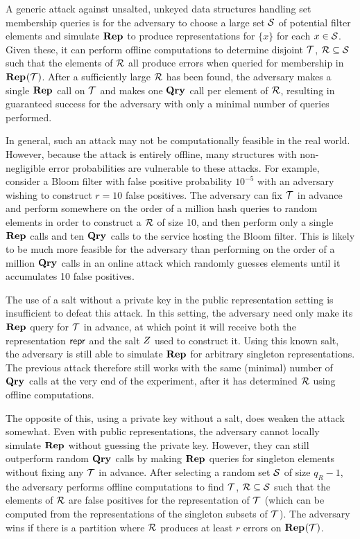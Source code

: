 A generic attack against unsalted, unkeyed data structures handling set membership queries is for the adversary to choose a large set $\mathcal{S}$ of potential filter elements and simulate $\mathbf{Rep}\hspace{0.5pt}$ to produce representations for $\{x\}$ for each $x \in \mathcal{S}$. Given these, it can perform offline computations to determine disjoint $\mathcal{T}$, $\mathcal{R} \subseteq \mathcal{S}$ such that the elements of $\mathcal{R}$ all produce errors when queried for membership in $\mathbf{Rep}\hspace{0.5pt}(\mathcal{T})$. After a sufficiently large $\mathcal{R}$ has been found, the adversary makes a single $\mathbf{Rep}\hspace{0.5pt}$ call on $\mathcal{T}$ and makes one $\mathbf{Qry}\hspace{0.5pt}$ call per element of $\mathcal{R}$, resulting in guaranteed success for the adversary with only a minimal number of queries performed.

In general, such an attack may not be computationally feasible in the real world. However, because the attack is entirely offline, many structures with non-negligible error probabilities are vulnerable to these attacks. For example, consider a Bloom filter with false positive probability $10^{-5}$ with an adversary wishing to construct $r = 10$ false positives. The adversary can fix $\mathcal{T}$ in advance and perform somewhere on the order of a million hash queries to random elements in order to construct a $\mathcal{R}$ of size 10, and then perform only a single $\mathbf{Rep}\hspace{0.5pt}$ calls and ten $\mathbf{Qry}\hspace{0.5pt}$ calls to the service hosting the Bloom filter. This is likely to be much more feasible for the adversary than performing on the order of a million $\mathbf{Qry}\hspace{0.5pt}$ calls in an online attack which randomly guesses elements until it accumulates 10 false positives.

The use of a salt without a private key in the public representation setting is insufficient to defeat this attack. In this setting, the adversary need only make its $\mathbf{Rep}\hspace{0.5pt}$ query for $\mathcal{T}$ in advance, at which point it will receive both the representation $\mathsf{repr}$ and the salt $Z$ used to construct it. Using this known salt, the adversary is still able to simulate $\mathbf{Rep}\hspace{0.5pt}$ for arbitrary singleton representations. The previous attack therefore still works with the same (minimal) number of $\mathbf{Qry}\hspace{0.5pt}$ calls at the very end of the experiment, after it has determined $\mathcal{R}$ using offline computations.

The opposite of this, using a private key without a salt, does weaken the attack somewhat. Even with public representations, the adversary cannot locally simulate $\mathbf{Rep}\hspace{0.5pt}$ without guessing the private key. However, they can still outperform random $\mathbf{Qry}\hspace{0.5pt}$ calls by making $\mathbf{Rep}\hspace{0.5pt}$ queries for singleton elements without fixing any $\mathcal{T}$ in advance. After selecting a random set $\mathcal{S}$ of size $q_R-1$, the adversary performs offline computations to find $\mathcal{T}$, $\mathcal{R} \subseteq \mathcal{S}$ such that the elements of $\mathcal{R}$ are false positives for the representation of $\mathcal{T}$ (which can be computed from the representations of the singleton subsets of $\mathcal{T}$). The adversary wins if there is a partition where $\mathcal{R}$ produces at least $r$ errors on $\mathbf{Rep}\hspace{0.5pt}(\mathcal{T})$.


